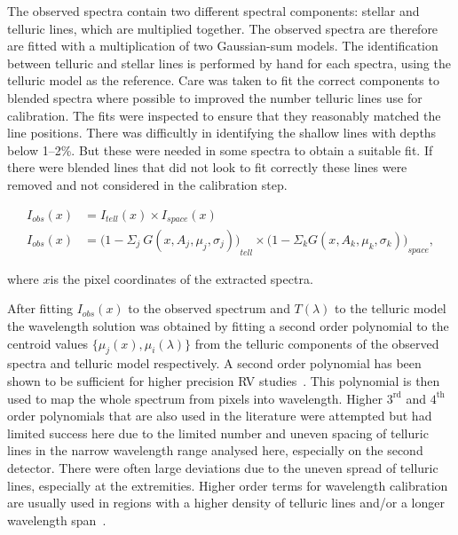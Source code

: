 The observed spectra contain two different spectral components: stellar and telluric lines, which are multiplied together. The observed spectra are therefore are fitted with a multiplication of two Gaussian-sum models. The identification between telluric and stellar lines is performed by hand for each spectra, using the telluric model as the reference. Care was taken to fit the correct components to blended spectra where possible to improved the number telluric lines use for calibration. The fits were inspected to ensure that they reasonably matched the line positions. There was difficultly in identifying the shallow lines with depths below 1--2\%. But these were needed in some spectra to obtain a suitable fit. If there were blended lines that did not look to fit correctly these lines were removed and not considered in the calibration step.

\begin{align}
I_{obs}(x) &= {I}_{tell}(x) \times {I}_{space}(x) \nonumber \\
I_{obs}(x) &= {\Big(1 - {\Sigma}_{j}\ G(x, A_{j}, {\mu}_{j}, {\sigma}_{j})\Big)}_{tell} \times {\Big(1 - {\Sigma}_{k} G(x, A_{k}, {\mu}_{k}, {\sigma}_{k})\Big)}_{space}, \label{eqn:obs}
\end{align}

where \(x\)is the pixel coordinates of the extracted spectra.


After fitting \(I_{obs}(x)\) to the observed spectrum and \(T(\lambda)\) to the telluric model the wavelength solution was obtained by fitting a second order polynomial to the centroid values \(\{\mu_{j}(x), \mu_{i}(\lambda)\}\) from the telluric components of the observed spectra and telluric model respectively. A second order polynomial has been shown to be sufficient for higher precision {RV} studies~\citep[e.g.,][]{bean_groundbased_2010, figueira_radial_2010}. This polynomial is then used to map the whole spectrum from pixels into wavelength. Higher \(3^{\textrm{rd}}\) and \(4^{\textrm{th}}\) order polynomials that are also used in the literature \citet[e.g.,][]{seifahrt_synthesising_2010, ulmer-moll_telluric_2018} were attempted but had limited success here due to the limited number and uneven spacing of telluric lines in the narrow wavelength range analysed here, especially on the second detector. There were often large deviations due to the uneven spread of telluric lines, especially at the extremities. Higher order terms for wavelength calibration are usually used in regions with a higher density of telluric lines and/or a longer wavelength span~\citep{piskorz_evidence_2016, seifahrt_synthesising_2010, ulmer-moll_telluric_2018}.

